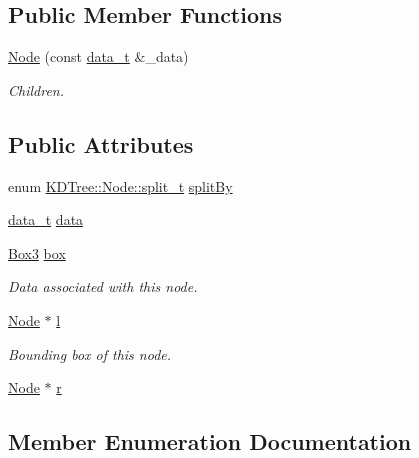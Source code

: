 \subsection*{Public Member Functions}
\begin{DoxyCompactItemize}
\item 
\hyperlink{structKDTree_1_1Node_ab83c48d5ca5c7b0aaee2831e8ffcea37}{Node} (const \hyperlink{classKDTree_ab000d86d0fb4aaedcc83b5b7a584c25e}{data\+\_\+t} \&\+\_\+data)
\begin{DoxyCompactList}\small\item\em Children. \end{DoxyCompactList}\end{DoxyCompactItemize}
\subsection*{Public Attributes}
\begin{DoxyCompactItemize}
\item 
enum \hyperlink{structKDTree_1_1Node_ab21ae38de8fe0e25d29d0ae136a1db34}{K\+D\+Tree\+::\+Node\+::split\+\_\+t} \hyperlink{structKDTree_1_1Node_a6ab2edd3f12f7e2f547c55d219252469}{split\+By}
\item 
\hyperlink{classKDTree_ab000d86d0fb4aaedcc83b5b7a584c25e}{data\+\_\+t} \hyperlink{structKDTree_1_1Node_a314e8792d65f995e383f2658f9c9a9d9}{data}
\item 
\hyperlink{structBox3}{Box3} \hyperlink{structKDTree_1_1Node_a71a3c79703c2fac391d11561f05f3bc3}{box}
\begin{DoxyCompactList}\small\item\em Data associated with this node. \end{DoxyCompactList}\item 
\hyperlink{structKDTree_1_1Node}{Node} $\ast$ \hyperlink{structKDTree_1_1Node_a9afeb2a23f401c72e147def1e8f9b133}{l}
\begin{DoxyCompactList}\small\item\em Bounding box of this node. \end{DoxyCompactList}\item 
\hyperlink{structKDTree_1_1Node}{Node} $\ast$ \hyperlink{structKDTree_1_1Node_a1ee516a9562dc5c6f53ad1176c2016a4}{r}
\end{DoxyCompactItemize}


\subsection{Member Enumeration Documentation}
